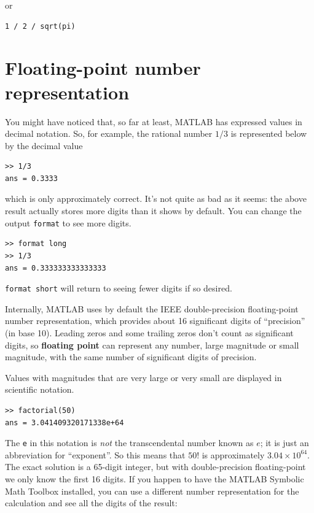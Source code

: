 \documentclass[
]{book}
\begin{document}
or

\begin{verbatim}
1 / 2 / sqrt(pi)
\end{verbatim}


\section{Floating-point number representation}

You might have noticed that, so far at least, MATLAB has expressed values in decimal
notation.  So, for example, the rational number $1/3$ is represented below
by the decimal value

\begin{verbatim}
>> 1/3
ans = 0.3333
\end{verbatim}

which is only approximately correct.  It's not quite as bad as
it seems: the above result actually stores more digits than it shows by default.
You can change the output {\tt format} to see more digits.

\begin{verbatim}
>> format long
>> 1/3
ans = 0.333333333333333
\end{verbatim}

{\tt format short} will return to seeing fewer digits if so desired.

Internally, MATLAB uses by default the IEEE double-precision floating-point
number representation, which provides about 16 significant digits of ``precision'' (in
base 10).
Leading zeros and some trailing zeros don't count as significant
digits, so {\bf floating point} can represent any number, large magnitude or small magnitude,
with the same number of significant digits of precision.

Values with magnitudes that are very large or very small are displayed in 
scientific notation.

\begin{verbatim}
>> factorial(50)
ans = 3.041409320171338e+64
\end{verbatim}

The {\tt e} in this notation is {\em not} the transcendental number
known as $e$; it is just an abbreviation for ``exponent''.  So
this means that $50!$ is approximately $3.04 \times 10^{64}$.  The
exact solution is a 65-digit integer, but with double-precision floating-point 
we only know the first 16
digits. 
If you happen to have the MATLAB Symbolic Math Toolbox installed, you can use a 
different number representation for the calculation and see all the digits of 
the result:
\end{document}
